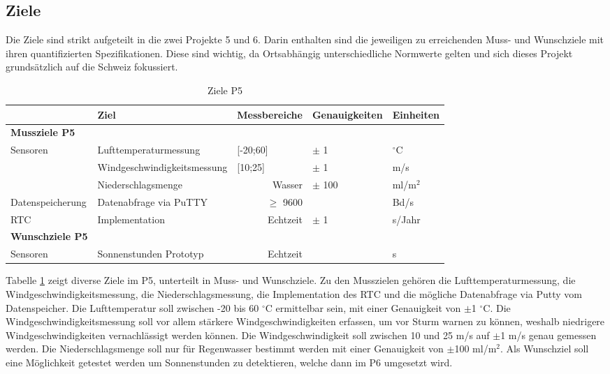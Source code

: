 \begin{landscape}
\section{Ziele}
\label{chap:Ziele}
Die Ziele sind strikt aufgeteilt in die zwei Projekte 5 und 6. Darin enthalten sind die jeweiligen zu erreichenden Muss- und Wunschziele mit ihren quantifizierten Spezifikationen. Diese sind wichtig, da Ortsabhängig unterschiedliche Normwerte gelten und sich dieses Projekt grundsätzlich auf die Schweiz fokussiert.\\
\begin{table}[htbp]
  \centering
  \caption{Ziele P5}
    \begin{tabular}{r|l|r|l|l}
          & \textbf{Ziel} & \multicolumn{1}{l|}{\textbf{Messbereiche}} & \textbf{Genauigkeiten} & \textbf{Einheiten} \\
    \toprule
    \multicolumn{1}{l}{\textbf{Mussziele P5}} & \multicolumn{1}{r}{} & \multicolumn{1}{r}{} & \multicolumn{1}{r}{} &  \\
    \toprule
    \multicolumn{1}{l|}{Sensoren} & Lufttemperaturmessung & \multicolumn{1}{l|}{[-20;60]} & $\pm$ 1 & $^\circ$C \\
\cline{2-5}          & Windgeschwindigkeitsmessung & \multicolumn{1}{l|}{[10;25]} & $\pm$ 1   & m/s \\
\cline{2-5} & Niederschlagsmenge &   Wasser    & $\pm$ 100 & ml/m$^2$ \\
    \hline
    \multicolumn{1}{l|}{Datenspeicherung} & Datenabfrage via PuTTY &   $\geq$ 9600    &       &  Bd/s\\
    \hline
    \multicolumn{1}{l|}{RTC} & Implementation &   Echtzeit    & $\pm$ 1   & s/Jahr \\
\bottomrule
\multicolumn{1}{l}{\textbf{Wunschziele P5}} & \multicolumn{1}{l}{} & \multicolumn{1}{l}{} & \multicolumn{1}{l}{} &  \\
    \toprule
    \multicolumn{1}{l|}{Sensoren} & Sonnenstunden Prototyp &   Echtzeit    &       & s \\
    \bottomrule
    \end{tabular}%
  \label{tab:ZieleP5}%
\end{table}%

Tabelle \ref{tab:ZieleP5} zeigt diverse Ziele im P5, unterteilt in Muss- und Wunschziele. Zu den Musszielen gehören die Lufttemperaturmessung, die Windgeschwindigkeitsmessung, die Niederschlagsmessung, die Implementation des RTC und die mögliche Datenabfrage via Putty vom Datenspeicher. Die Lufttemperatur soll zwischen -20 bis 60 $^\circ$C ermittelbar sein, mit einer Genauigkeit von $\pm$1 $^\circ$C. Die Windgeschwindigkeitsmessung soll vor allem stärkere Windgeschwindigkeiten erfassen, um vor Sturm warnen zu können, weshalb niedrigere Windgeschwindigkeiten vernachlässigt werden können. Die Windgeschwindigkeit soll zwischen 10 und 25 m/s auf $\pm$1 m/s genau gemessen werden. Die Niederschlagsmenge soll nur für Regenwasser bestimmt werden mit einer Genauigkeit von $\pm$100 ml/m$^2$. Als Wunschziel soll eine Möglichkeit getestet werden um Sonnenstunden zu detektieren, welche dann im P6 umgesetzt wird.\\


\end{landscape}
